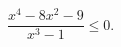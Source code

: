 \begin{ex}[type=inequality]
	\begin{condition}
		$\dfrac{x^4 - 8x^2 - 9}{x^3 - 1} \leqslant 0  .$
	\end{condition}
\end{ex}